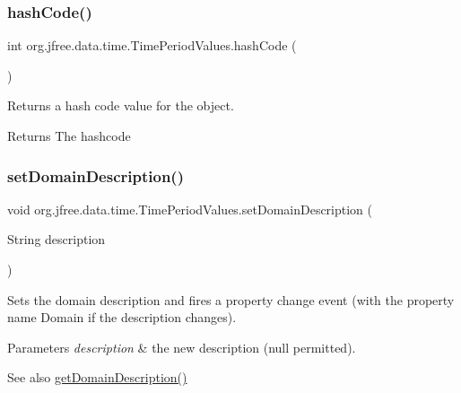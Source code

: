 \subsubsection{\texorpdfstring{hash\+Code()}{hashCode()}}
{\footnotesize\ttfamily int org.\+jfree.\+data.\+time.\+Time\+Period\+Values.\+hash\+Code (\begin{DoxyParamCaption}{ }\end{DoxyParamCaption})}

Returns a hash code value for the object.

\begin{DoxyReturn}{Returns}
The hashcode 
\end{DoxyReturn}
\mbox{\label{classorg_1_1jfree_1_1data_1_1time_1_1_time_period_values_aac7ff6c5c3cb5112bf53122aa3c516bf}} 
\subsubsection{\texorpdfstring{set\+Domain\+Description()}{setDomainDescription()}}
{\footnotesize\ttfamily void org.\+jfree.\+data.\+time.\+Time\+Period\+Values.\+set\+Domain\+Description (\begin{DoxyParamCaption}\item[{String}]{description }\end{DoxyParamCaption})}

Sets the domain description and fires a property change event (with the property name {\ttfamily Domain} if the description changes).


\begin{DoxyParams}{Parameters}
{\em description} & the new description ({\ttfamily null} permitted).\\
\hline
\end{DoxyParams}
\begin{DoxySeeAlso}{See also}
\mbox{\hyperlink{classorg_1_1jfree_1_1data_1_1time_1_1_time_period_values_a75e780afe26b96d7adc5ab6518818d14}{get\+Domain\+Description()}} 
\end{DoxySeeAlso}
\mbox{\label{classorg_1_1jfree_1_1data_1_1time_1_1_time_period_values_a16ace4528f97c1fc68d5edb578373092}} 
